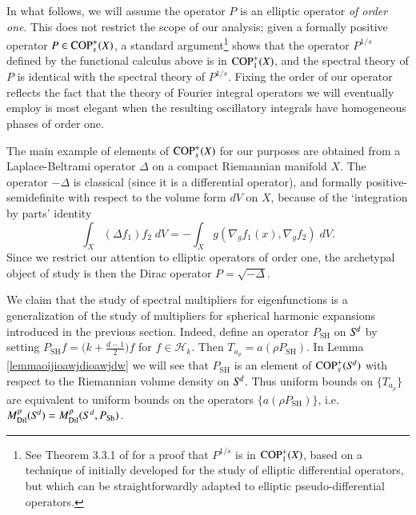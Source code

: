 In what follows, we will assume the operator $P$ is an elliptic operator \emph{of order one}. This does not restrict the scope of our analysis; given a formally positive operator $P \in {\text{COP}^{+}_{{s}}}(X)$, a standard argument\footnote{See Theorem 3.3.1 of \cite{Sogge} for a proof that $P^{1/s}$ is in ${\text{COP}^{+}_{{1}}}(X)$, based on a technique of \cite{Seeley} initially developed for the study of elliptic differential operators, but which can be straightforwardly adapted to elliptic pseudo-differential operators.} shows that the operator $P^{1/s}$ defined by the functional calculus above is in ${\text{COP}^{+}_{{1}}}(X)$, and the spectral theory of $P$ is identical with the spectral theory of $P^{1/s}$. Fixing the order of our operator reflects the fact that the theory of Fourier integral operators we will eventually employ is most elegant when the resulting oscillatory integrals have homogeneous phases of order one.

%
%

The main example of elements of ${\text{COP}^{+}_{{s}}}(X)$ for our purposes are obtained from a Laplace-Beltrami operator $\Delta$ on a compact Riemannian manifold $X$. The operator $-\Delta$ is classical (since it is a differential operator), and formally positive-semidefinite with respect to the volume form $dV$ on $X$, because of the `integration by parts' identity
%
\[ \int_X (\Delta f_1) f_2\; dV = - \int_X g( \nabla_g f_1(x), \nabla_g f_2 )\; dV. \]
%
Since we restrict our attention to elliptic operators of order one, the archetypal object of study is then the Dirac operator $P = \sqrt{-\Delta}$.

We claim that the study of spectral multipliers for eigenfunctions is a generalization of the study of multipliers for spherical harmonic expansions introduced in the previous section. Indeed, define an operator $P_{\text{SH}}$ on ${S}^{\!{d}}$ by setting $P_{\text{SH}} f = \big( k + \tfrac{d-1}{2} \big)f$ for $f \in \mathcal{H}_k$. Then $T_{a_\rho} = a(\rho P_{\text{SH}})$. In Lemma \ref{lemmaoijioawjdioawjdw} we will see that $P_{\text{SH}}$ is an element of ${\text{COP}^{+}_{{s}}}({S}^{\!{d}})$ with respect to the Riemannian volume density on ${S}^{\!{d}}$. Thus uniform bounds on $\{ T_{a_\rho} \}$ are equivalent to uniform bounds on the operators $\{ a(\rho P_{\text{SH}}) \}$, i.e. $M^p_{\text{Dil}}({S}^{\!{d}}) = M^p_{\text{Dil}}(S^d,P_{\text{Sh}})$.

